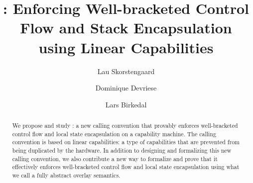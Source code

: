 \documentclass[acmsmall,review,showframe]{acmart}\settopmatter{printfolios=true,printccs=false,printacmref=false}
\begin{document}
\title{\stktokens{}: Enforcing Well-bracketed Control Flow and Stack Encapsulation using Linear Capabilities}


\author{Lau Skorstengaard}

\author{Dominique Devriese}

\author{Lars Birkedal}

\begin{abstract}
  We propose and study \stktokens{}: a new calling convention that provably enforces well-bracketed control flow and local state encapsulation on a capability machine.
  The calling convention is based on linear capabilities: a type of capabilities that are prevented from being duplicated by the hardware.
  In addition to designing and formalizing this new calling convention, we also contribute a new way to formalize and prove that it effectively enforces well-bracketed control flow and local state encapsulation using what we call a fully abstract overlay semantics.
\end{abstract}


\end{document}
